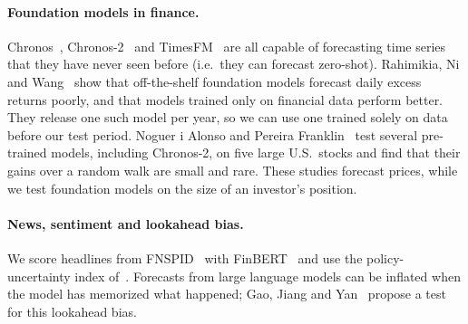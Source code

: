 \paragraph{Foundation models in finance.}
Chronos~\cite{ansari2024chronos}, Chronos-2~\cite{ansari2025chronos2} and
TimesFM~\cite{das2024timesfm} are all capable of forecasting time series that
they have never seen before (i.e.\ they can forecast zero-shot). Rahimikia,
Ni and Wang~\cite{rahimikia2025tsfm} show that off-the-shelf foundation models
forecast daily excess returns poorly, and that models trained only on
financial data perform better. They release one such model per year, so we
can use one trained solely on data before our test period.
Noguer i Alonso and Pereira Franklin~\cite{noguer2026tsfm} test several
pre-trained models, including Chronos-2, on five large U.S.\ stocks and find
that their gains over a random walk are small and rare. These studies forecast prices, while we
test foundation models on the size of an investor's position.

\paragraph{News, sentiment and lookahead bias.}
We score headlines from FNSPID~\cite{dong2024fnspid} with
FinBERT~\cite{araci2019finbert} and use the policy-uncertainty index
of~\cite{baker2016epu}. Forecasts from large language models can be inflated
when the model has memorized what happened; Gao, Jiang and
Yan~\cite{gao2025lookahead} propose a test for this lookahead bias.
